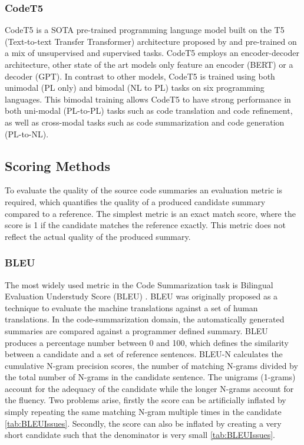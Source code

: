 \subsubsection{CodeT5}
CodeT5 is a SOTA pre-trained programming language model built on the T5 (Text-to-text Transfer Transformer) architecture proposed by \citeauthor{CodeT5} and pre-trained on a mix of unsupervised and supervised tasks. CodeT5 employs an encoder-decoder architecture, other state of the art models only feature an encoder (BERT) or a decoder (GPT).
In contrast to other models, CodeT5 is trained using both unimodal (PL only) and bimodal (NL to PL) tasks on six programming languages. This bimodal training allows CodeT5 to have strong performance in both uni-modal (PL-to-PL) tasks such as code translation and code refinement, as well as cross-modal tasks such as code summarization and code generation (PL-to-NL).

\subsection{Scoring Methods}
To evaluate the quality of the source code summaries an evaluation metric is required, which quantifies the quality of a produced candidate summary compared to a reference. The simplest metric is an exact match score, where the score is 1 if the candidate matches the reference exactly. This metric does not reflect the actual quality of the produced summary.

\subsubsection{BLEU}
The most widely used metric in the Code Summarization task is Bilingual Evaluation Understudy Score (BLEU) \cite{evaluationSummarization}. BLEU was originally proposed as a technique to evaluate the machine translations against a set of human translations. In the code-summarization domain, the automatically generated summaries are compared against a programmer defined summary. 
BLEU produces a percentage number between 0 and 100, which defines the similarity between a candidate and a set of reference sentences. BLEU-N calculates the cumulative N-gram precision scores, the number of matching N-grams divided by the total number of N-grams in the candidate sentence. The unigrams (1-grams) account for the adequacy of the candidate while the longer N-grams account for the fluency. 
Two problems arise, firstly the score can be artificially inflated by simply repeating the same matching N-gram multiple times in the candidate \ref{tab:BLEUIssues}. Secondly, the score can also be inflated by creating a very short candidate such that the denominator is very small \ref{tab:BLEUIssues}.

